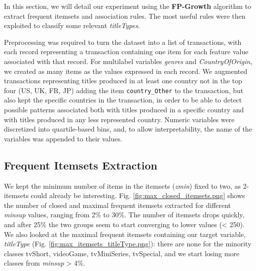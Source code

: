 \label{pattern_mining}
In this section, we will detail our experiment using the \textbf{FP-Growth} algorithm to extract frequent itemsets and association rules. The most useful rules were then exploited to classify some relevant \textit{titleTypes}.

Preprocessing was required to turn the dataset into a list of transactions, with each record representing a transaction containing one item for each feature value associated with that record.
For multilabel variables \textit{genres} and \textit{CountryOfOrigin}, we created as many items as the values expressed in each record.
We augmented transactions representing titles produced in at least one country not in the top four (US, UK, FR, JP) adding the item \texttt{country\_Other} to the transaction, but also kept the specific countries in the transaction, in order to be able to detect possible patterns associated both with titles produced in a specific country and with titles produced in any less represented country.
Numeric variables were discretized into quartile-based bins, and, to allow interpretability, the name of the variables was appended to their values.
\subsection{Frequent Itemsets Extraction}
We kept the minimum number of items in the itemsets (\textit{zmin}) fixed to two, as 2-itemsets could already be interesting. Fig. \ref{fig:max_closed_itemsets.png} shows the number of closed and maximal frequent itemsets extracted for different \textit{minsup} values, ranging from 2\% to 30\%. The number of itemsets drops quickly, and after 25\% the two groups seem to start converging to lower values (< 250). We also looked at the maximal frequent itemsets containing our target variable, \textit{titleType} (Fig. \ref{fig:max_itemsets_titleType.png}): there are none for the minority classes tvShort, videoGame, tvMiniSeries, tvSpecial, and we start losing more classes from \textit{minsup} > 4\%.

